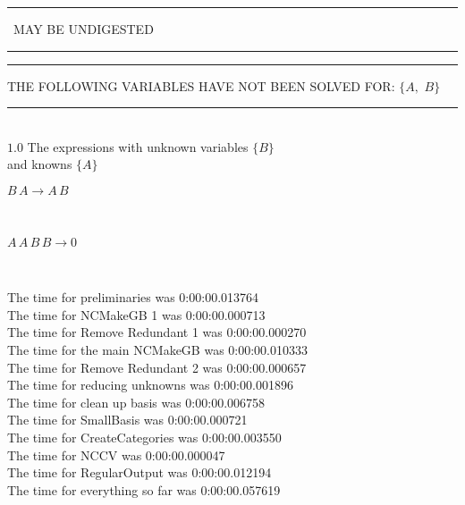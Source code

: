 \documentclass[rep10,leqno]{report}
\begin{document}
\rule[2pt]{2.18in}{4pt}
\ MAY BE UNDIGESTED\ 
\rule[2pt]{2.18in}{4pt}\hfil\break
\rule[2pt]{6in}{4pt}\hfil\break
THE FOLLOWING VARIABLES HAVE NOT BEEN SOLVED FOR:\hfil\break
$\{A,
$ $
B\}$
\smallskip\\
\rule[3pt]{6in}{.7pt}\\
$1.0$  The expressions with unknown variables $\{B\}$\\
and knowns $\{A\}$\smallskip\\
\begin{minipage}{6in}
$
B\,
 A\rightarrow A\,
 B
$
\end{minipage}\medskip \\
\begin{minipage}{6in}
$
A\,
 A\,
 B\,
 B\rightarrow 0
$
\end{minipage}\\
\vspace{10pt}

\noindent
The time for preliminaries was 0:00:00.013764\\
The time for NCMakeGB 1 was 0:00:00.000713\\
The time for Remove Redundant 1 was 0:00:00.000270\\
The time for the main NCMakeGB was 0:00:00.010333\\
The time for Remove Redundant 2 was 0:00:00.000657\\
The time for reducing unknowns was 0:00:00.001896\\
The time for clean up basis was 0:00:00.006758\\
The time for SmallBasis was 0:00:00.000721\\
The time for CreateCategories was 0:00:00.003550\\
The time for NCCV was 0:00:00.000047\\
The time for RegularOutput was 0:00:00.012194\\
The time for everything so far was 0:00:00.057619\\
\end{document}

